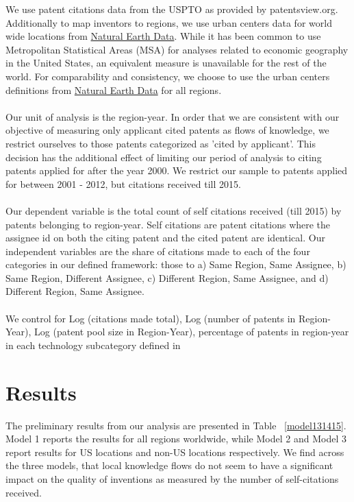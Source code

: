 \documentclass[12pt]{article}
\begin{document}
We use patent citations data from the USPTO as provided by patentsview.org. Additionally to map inventors to regions, we use urban centers data for world wide locations from \href{http://www.naturalearthdata.com/downloads/10m-cultural-vectors/}{Natural Earth Data}.  While it has been common to use Metropolitan Statistical Areas (MSA) for analyses related to economic geography in the United States, an equivalent measure is unavailable for the rest of the world. For comparability and consistency, we choose to use the urban centers definitions from \href{http://www.naturalearthdata.com/downloads/10m-cultural-vectors/}{Natural Earth Data} for all regions.
\\\\
Our unit of analysis is the region-year. In order that we are consistent with our objective of measuring only applicant cited patents as flows of knowledge, we restrict ourselves to those patents categorized as 'cited by applicant'. This decision has the additional effect of limiting our period of analysis to citing patents applied for after the year 2000. We restrict our sample to patents applied for between 2001 - 2012, but citations received till 2015.
\\\\
Our dependent variable is the  total count of self citations received (till 2015) by patents belonging to region-year. Self citations are patent citations where the assignee id on both the citing patent and the cited patent are identical. Our independent variables are the share of citations made to each of the four categories in our defined framework: those to a) Same Region, Same Assignee, b) Same Region, Different Assignee, c) Different Region, Same Assignee, and d) Different Region, Same Assignee.
\\\\
We control for Log (citations made total), Log (number of patents in Region-Year), Log (patent pool size in Region-Year), percentage of patents in region-year in each technology subcategory defined in \cite{Hall2001}

\section*{Results}
The preliminary results from our analysis are presented in Table ~\ref{model131415}. Model 1 reports the results for all regions worldwide, while Model 2 and Model 3 report results for US locations and non-US locations respectively. We find across the three models, that local knowledge flows do not seem to have a significant impact on the quality of inventions as measured by the number of self-citations received. 
\end{document}

